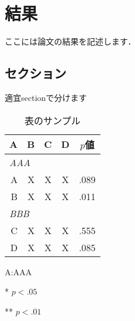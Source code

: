 \chapter{結果}

ここには論文の結果を記述します．

\section{セクション}

適宜sectionで分けます

\begin{table}[htb]
    \centering
    \begin{threeparttable}[htb] \caption{表のサンプル} \label{tab:1}
        \begin{tabular}{rrccc}
            \toprule
                    A & B & C & D & \(p\)値 \\
                    \midrule
                \multicolumn{5}{l}{\emph{AAA}} \\
                A & X & X & X & .089 \\
                B & X & X & X & .011\tnote{*} \\
                \multicolumn{5}{l}{\emph{BBB}} \\
                C & X & X & X & .555 \\
                D & X & X & X & .085 \\
            \bottomrule
        \end{tabular}
        \begin{tablenotes}
            \item A:\;AAA
            \item[*] \(p < .05\)
            \item[**] \(p < .01\)
        \end{tablenotes}
    \end{threeparttable}
\end{table}
